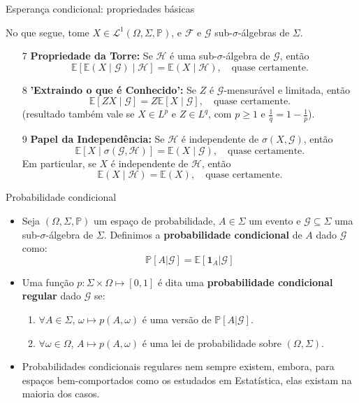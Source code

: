 \documentclass[11pt]{beamer}
\begin{document}
	
		\begin{frame}{Esperança condicional: propriedades básicas}
		
		No que segue, tome $X \in \mathcal{L}^1(\Omega,\Sigma,\mathbb{P})$, e $\mathcal{F}$ e $\mathcal{G}$ sub-$\sigma$-álgebras de $\Sigma$.
		\begin{lemma}
			\begin{enumerate}
			\item[7] \textbf{Propriedade da Torre:}  
			Se \( \mathcal{H} \) é uma sub-\(\sigma\)-álgebra de \( \mathcal{G} \), então
			\[
			\mathbb{E}[\mathbb{E}(X \mid \mathcal{G}) \mid \mathcal{H}] = \mathbb{E}(X \mid \mathcal{H}), \quad \text{quase certamente}.
			\]
			
			\item[8] \textbf{'Extraindo o que é Conhecido':}  
			Se \( Z \) é \( \mathcal{G} \)-mensurável e limitada, então
			\[
			\mathbb{E}[ZX \mid \mathcal{G}] = Z \mathbb{E}[X \mid \mathcal{G}], \quad \text{quase certamente}.
			\]
				(resultado também vale se $X\in L^p$ e $Z \in L^q$, com $p\geq1$ e $\frac{1}{q} = 1-\frac{1}{p}$).
			
			\item[9] \textbf{Papel da Independência:}  
			Se \( \mathcal{H} \) é independente de \( \sigma(X, \mathcal{G}) \), então
			\[
			\mathbb{E}[X \mid \sigma(\mathcal{G}, \mathcal{H})] = \mathbb{E}(X \mid \mathcal{G}), \quad \text{quase certamente}.
			\]
			Em particular, se \( X \) é independente de \( \mathcal{H} \), então
			\[
			\mathbb{E}(X \mid \mathcal{H}) = \mathbb{E}(X), \quad \text{quase certamente}.
			\]
			\end{enumerate}
		\end{lemma}
		
		
		
	\end{frame}
	
		\begin{frame}{Probabilidade condicional}
\begin{itemize}
	\item Seja $(\Omega, \Sigma,\mathbb{P})$ um espaço de probabilidade, $A \in \Sigma$ um evento e $\mathcal{G}\subseteq \Sigma$ uma sub-$\sigma$-álgebra de $\Sigma$. Definimos a \textbf{probabilidade condicional} de $A$ dado $\mathcal{G}$ como:
	$$\mathbb{P}[A|\mathcal{G}] = \mathbb{E}[\mathbf{1}_{A}|\mathcal{G}]$$
\item Uma função $p: \Sigma \times \Omega \mapsto [0,1]$ é dita uma \textbf{probabilidade condicional regular}  dado $\mathcal{G}$ se:
\begin{enumerate}
	\item $\forall A \in \Sigma$, $\omega \mapsto p(A,\omega)$ é uma versão de $\mathbb{P}[A|\mathcal{G}]$.
	\item $\forall \omega \in \Omega$, $A \mapsto p(A, \omega)$ é uma lei de probabilidade sobre $(\Omega, \Sigma)$.
\end{enumerate}
\item Probabilidades condicionais regulares nem sempre existem, embora, para espaços bem-comportados como os estudados em Estatística, elas existam na maioria dos casos.
\end{itemize}
\end{frame}
\end{document}
